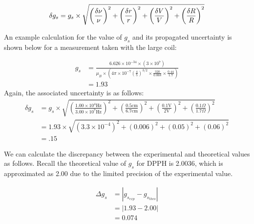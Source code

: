 \documentclass[a4paper]{article}
\begin{document}
\begin{equation}
\label{eq:delta_gs}
\delta g_s = g_s \times
              \sqrt {
              		  \left( \frac{\delta \nu}{\nu} \right) ^2
              		+ \left( \frac{\delta r}{r} \right) ^2
              		+ \left( \frac{\delta V}{V} \right) ^2
              		+ \left( \frac{\delta R}{R} \right) ^2
					} \\ \\
\end{equation}

An example calculation for the value of $g_s$ and its propagated
uncertainty is shown below for a measurement taken with the large
coil:

\begin{align*}
g_s &= \frac
		{6.626 \times 10^{-34} \times  \left( 3 \times 10^7 \right) }
		{\mu_B \times \left( 4 \pi \times 10^{-7}
						     \left( \frac{4}{5} \right) ^{3/2}
						     \times \frac{320}{0.068}
						     \times \frac{0.44}{1.7} \right)
	     } \\
    &= 1.93
\end{align*}
%
Again, the associated uncertainty is as follows:
%
\begin{align*}
\delta g_s &=
		   g_s \times
              \sqrt {
              		  \left( \frac{1.00 \times 10^4 \text{Hz}}{3.00 \times 10^7 \text{Hz}} \right) ^2
              		+ \left( \frac{0.5 \text{cm}}{6.7 \text{cm}} \right) ^2
              		+ \left( \frac{0.1 \text{V}}{2 \text{V}} \right) ^2
              		+ \left( \frac{0.1 \Omega}{1.7 \Omega} \right) ^2
					} \\
		  &= 1.93 \times
              \sqrt {
              		  \left( 3.3 \times 10^{-4} \right) ^2
              		+ \left( 0.006 \right) ^2
              		+ \left( 0.05 \right) ^2
              		+ \left( 0.06 \right) ^2
					} \\
		  &= .15
\end{align*}

\newpage

We can calculate the discrepancy between the experimental and
theoretical values as follows. Recall the theoretical value of $g_s$
for DPPH is 2.0036, which is approximated as 2.00 due to the limited
precision of the experimental value.


\begin{align*}
\Delta g_s &= | g_{s_{exp}} - g_{s_{theo}} | \\ &= | 1.93 - 2.00 |
\\ &= 0.074 \\
\end{align*}
\end{document}
